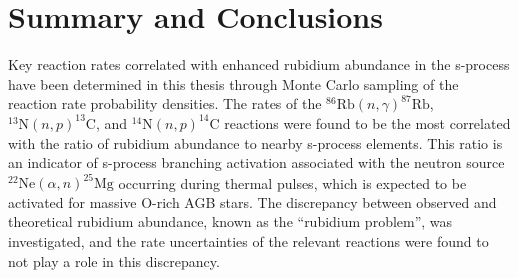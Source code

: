 \chapter{Summary and Conclusions}
\label{chap:conc}




Key reaction rates correlated with enhanced rubidium abundance in the s-process have been determined in this thesis through Monte Carlo sampling of the reaction rate probability densities. The rates of the $^{86}\mathrm{Rb}(n,\gamma)^{87}\mathrm{Rb}$, $^{13}\mathrm{N}(n,p)^{13}\mathrm{C}$, and $^{14}\mathrm{N}(n,p)^{14}\mathrm{C}$ reactions were found to be the most correlated with the ratio of rubidium abundance to nearby s-process elements. This ratio is an indicator of s-process branching activation associated with the neutron source $^{22}\mathrm{Ne}(\alpha,n)^{25}\mathrm{Mg}$ occurring during thermal pulses, which is expected to be activated for massive O-rich AGB stars. The discrepancy between observed and theoretical rubidium abundance, known as the ``rubidium problem'', was investigated, and the rate uncertainties of the relevant reactions were found to not play a role in this discrepancy.

